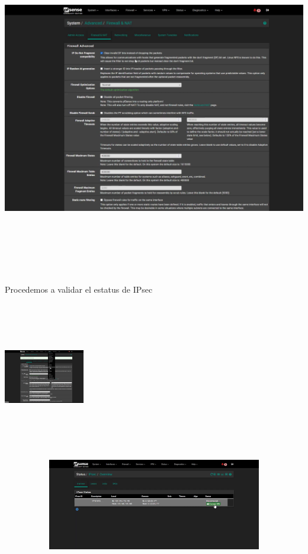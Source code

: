 \documentclass{article} %
\begin{document}
\noindent \includegraphics*[width=6.41in, height=5.81in, trim=1.69in 0.00in 0.87in 0.40in]{image43}

\noindent 

\noindent Procedemos a validar el estatus de IPsec

\noindent \includegraphics*[width=1.39in, height=2.55in, trim=4.95in 3.87in 3.24in 0.00in]{image44}

\noindent 

\noindent \includegraphics*[width=6.00in, height=1.57in, trim=0.85in 1.31in 0.85in 0.39in]{image45}
\end{document}
